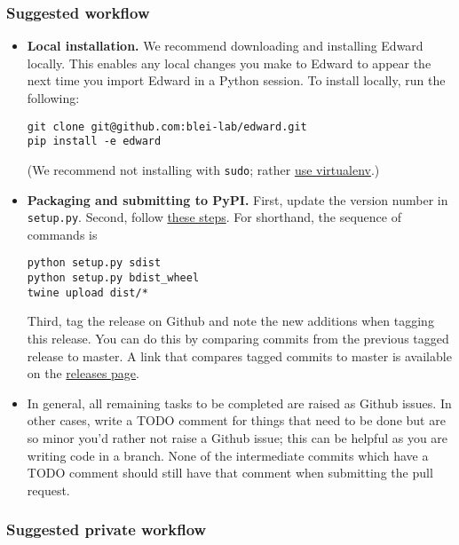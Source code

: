 \subsubsection{Suggested workflow}\label{suggested-workflow}

\begin{itemize}
\item
  \textbf{Local installation.}
  We recommend downloading and installing Edward locally. This enables
  any local changes you make to Edward to appear the next time you
  import Edward in a Python session. To install locally, run the
  following:

\begin{verbatim}
git clone git@github.com:blei-lab/edward.git
pip install -e edward
\end{verbatim}

  (We recommend not installing with \texttt{sudo}; rather
  \href{http://docs.python-guide.org/en/latest/starting/install/osx/}{use
  virtualenv}.)
\item
  \textbf{Packaging and submitting to PyPI.} First, update the version
  number in \texttt{setup.py}. Second, follow
  \href{https://packaging.python.org/en/latest/distributing/\#packaging-your-project}{these
  steps}. For shorthand, the sequence of commands is

\begin{lstlisting}[class=JSON]
python setup.py sdist
python setup.py bdist_wheel
twine upload dist/*
\end{lstlisting}

  Third, tag the release on Github and note the new additions when
  tagging this release. You can do this by comparing commits from the
  previous tagged release to master. A link that compares tagged commits
  to master is available on the
  \href{https://github.com/blei-lab/edward/releases}{releases page}.
\item
  In general, all remaining tasks to be completed are raised as Github
  issues. In other cases, write a TODO comment for things that need to
  be done but are so minor you'd rather not raise a Github issue; this
  can be helpful as you are writing code in a branch. None of the
  intermediate commits which have a TODO comment should still have
  that comment when submitting the pull request.
\end{itemize}

\subsubsection{Suggested private
workflow}\label{suggested-private-workflow}

